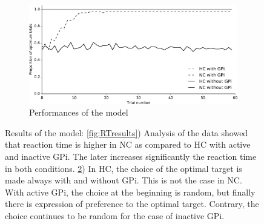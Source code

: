 \begin{figure}[h]
        \begin{subfigure}[b]{0.9\textwidth}
                \includegraphics[width=\textwidth]{Performances}
        		  \vspace{2mm}
                \caption{Performances of the model}
                \label{fig:Performances}
        \end{subfigure}
        \vspace{4mm}
        \caption{Results of the model: 
        					\ref{fig:RTresults}) Analysis of the data showed that
        					 reaction time is higher in NC as compared to HC 
        					 with active and inactive GPi. The later increases
        					 significantly the reaction time in both conditions.
        					 \ref{fig:Performances}) In HC, the choice of the
        					 optimal target is made always with and without
        					 GPi. This is not the case in NC. With active GPi, the
        					 choice at the beginning is random, but finally there 
        					 is expression of preference to the optimal target. 
        					 Contrary, the choice continues to be random for the
        					 case of inactive GPi.}
\end{figure}


